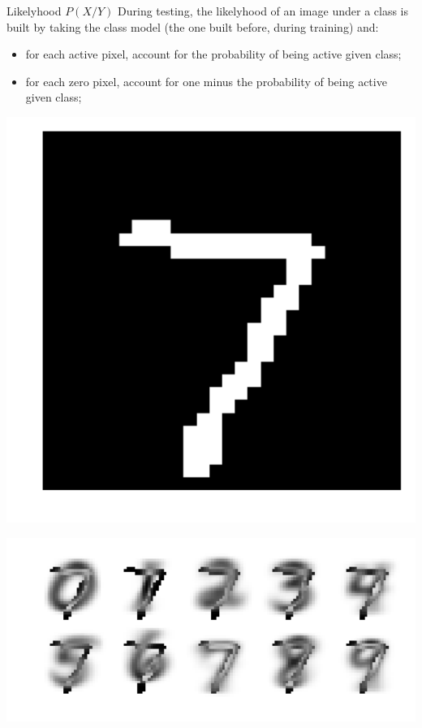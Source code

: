 \bgroup  
\begin{frame}{Likelyhood $P(X/Y)$}
During testing, the likelyhood of an image under a class is built by taking the class model (the one built before, during training) and:
\begin{itemize}
\item for each active pixel, account for the probability of being active given class;
\item for each zero pixel, account for one minus the probability of being active given class;
\end{itemize}
\begin{minipage}{0.25\textwidth}
\centering
\includegraphics[width=\textwidth]{img/test_image.pdf}
\end{minipage}
\begin{minipage}{0.65\textwidth}
\centering
\includegraphics[width=\textwidth]{img/likelyhood.pdf}
\end{minipage}
\end{frame}
\egroup